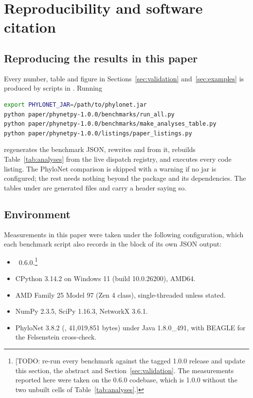 \section{Reproducibility and software citation}
\label{sec:reproducibility}

\subsection{Reproducing the results in this paper}

Every number, table and figure in Sections~\ref{sec:validation}
and~\ref{sec:examples} is produced by scripts in
. Running

\begin{lstlisting}[language=bash, basicstyle=\ttfamily\small]
export PHYLONET_JAR=/path/to/phylonet.jar
python paper/phynetpy-1.0.0/benchmarks/run_all.py
python paper/phynetpy-1.0.0/benchmarks/make_analyses_table.py
python paper/phynetpy-1.0.0/listings/paper_listings.py
\end{lstlisting}

regenerates the benchmark JSON, rewrites  and
 from it, rebuilds Table~\ref{tab:analyses} from
the live dispatch registry, and executes every code listing. The PhyloNet
comparison is skipped with a warning if no jar is configured; the rest needs
nothing beyond the package and its dependencies. The tables under
 are generated files and carry a header saying so.

\subsection{Environment}

Measurements in this paper were taken under the following configuration, which
each benchmark script also records in the  block of its own JSON
output:

\begin{itemize}
  \item \phynetpy\ 0.6.0.\footnote{[TODO: re-run every benchmark against the
    tagged 1.0.0 release and update this section, the abstract and
    Section~\ref{sec:validation}. The measurements reported here were taken on
    the 0.6.0 codebase, which is 1.0.0 without the two unbuilt cells of
    Table~\ref{tab:analyses}.]}
  \item CPython 3.14.2 on Windows 11 (build 10.0.26200), AMD64.
  \item AMD Family 25 Model 97 (Zen 4 class), single-threaded unless stated.
  \item NumPy 2.3.5, SciPy 1.16.3, NetworkX 3.6.1.
  \item PhyloNet 3.8.2 (, 41{,}019{,}851 bytes) under
    Java 1.8.0\_491, with BEAGLE for the Felsenstein cross-check.
\end{itemize}

